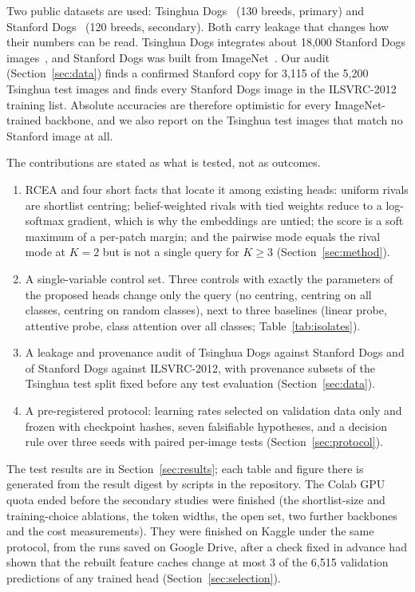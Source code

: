 \documentclass[11pt,a4paper]{article}
\theoremstyle{plain}
\begin{document}
Two public datasets are used: Tsinghua Dogs~\citep{zou2020tsinghuadogs} (130 breeds, primary) and Stanford
Dogs~\citep{khosla2011stanforddogs} (120 breeds, secondary). Both carry leakage that changes how their numbers can be
read. Tsinghua Dogs integrates about 18,000 Stanford Dogs images~\citep{zou2020tsinghuadogs}, and Stanford Dogs was
built from ImageNet~\citep{khosla2011stanforddogs,krause2016unreasonable}. Our audit (Section~\ref{sec:data}) finds a
confirmed Stanford copy for 3,115 of the 5,200 Tsinghua test images and finds every Stanford Dogs image in the
ILSVRC-2012 training list. Absolute accuracies are therefore optimistic for every ImageNet-trained backbone, and we
also report on the Tsinghua test images that match no Stanford image at all.

The contributions are stated as what is tested, not as outcomes.
\begin{enumerate}[leftmargin=*,itemsep=2pt]
\item RCEA and four short facts that locate it among existing heads: uniform rivals are shortlist centring;
  belief-weighted rivals with tied weights reduce to a log-softmax gradient, which is why the embeddings are untied;
  the score is a soft maximum of a per-patch margin; and the pairwise mode equals the rival mode at $K=2$ but is not
  a single query for $K\ge3$ (Section~\ref{sec:method}).
\item A single-variable control set. Three controls with exactly the parameters of the proposed heads change only
  the query (no centring, centring on all classes, centring on random classes), next to three baselines (linear
  probe, attentive probe, class attention over all classes; Table~\ref{tab:isolates}).
\item A leakage and provenance audit of Tsinghua Dogs against Stanford Dogs and of Stanford Dogs against
  ILSVRC-2012, with provenance subsets of the Tsinghua test split fixed before any test evaluation
  (Section~\ref{sec:data}).
\item A pre-registered protocol: learning rates selected on validation data only and frozen with checkpoint hashes,
  seven falsifiable hypotheses, and a decision rule over three seeds with paired per-image tests
  (Section~\ref{sec:protocol}).
\end{enumerate}

The test results are in Section~\ref{sec:results}; each table and figure there is generated from the result digest by
scripts in the repository. The Colab GPU quota ended before the secondary studies were finished (the shortlist-size and
training-choice ablations, the token widths, the open set, two further backbones and the cost measurements). They were
finished on Kaggle under the same protocol, from the runs saved on Google Drive, after a check fixed in advance had
shown that the rebuilt feature caches change at most 3 of the 6,515 validation predictions of any trained head
(Section~\ref{sec:selection}).
\end{document}
